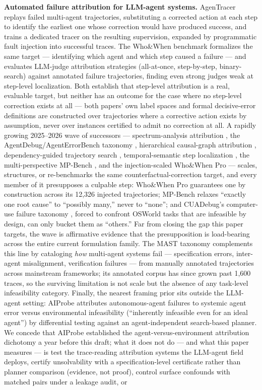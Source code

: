 \documentclass[11pt]{article}
\begin{document}
\textbf{Automated failure attribution for LLM-agent systems.} AgenTracer \citep{AgenTracer05D} replays failed multi-agent trajectories, substituting a corrected action at each step to identify the earliest one whose correction would have produced success, and trains a dedicated tracer on the resulting supervision, expanded by programmatic fault injection into successful traces. The Who\&When benchmark \citep{WhoWhen0212} formalizes the same target --- identifying which agent and which step caused a failure --- and evaluates LLM-judge attribution strategies (all-at-once, step-by-step, binary-search) against annotated failure trajectories, finding even strong judges weak at step-level localization. Both establish that step-level attribution is a real, evaluable target, but neither has an outcome for the case where no step-level correction exists at all --- both papers' own label spaces and formal decisive-error definitions are constructed over trajectories where a corrective action exists by assumption, never over instances certified to admit no correction at all. A rapidly growing 2025--2026 wave of successors --- spectrum-analysis attribution \citep{FAMAS3782}, the AgentDebug/AgentErrorBench taxonomy \citep{AgentDebug5370}, hierarchical causal-graph attribution \citep{CHIEF3701}, dependency-guided trajectory search \citep{FALAT0765}, temporal-semantic step localization \citep{StepFinder3467}, the multi-perspective MP-Bench \citep{MPBench5001}, and the injection-scaled Who\&When Pro \citep{WhoWhenPro9996} --- scales, structures, or re-benchmarks the same counterfactual-correction target, and every member of it presupposes a culpable step: Who\&When Pro guarantees one by construction across its 12{,}326 injected trajectories; MP-Bench relaxes ``exactly one root cause'' to ``possibly many,'' never to ``none''; and CUADebug's computer-use failure taxonomy \citep{CUADebug2643}, forced to confront OSWorld tasks that are infeasible by design, can only bucket them as ``others.'' Far from closing the gap this paper targets, the wave is affirmative evidence that the presupposition is load-bearing across the entire current formulation family. The MAST taxonomy \citep{MAST3657} complements this line by cataloging \emph{how} multi-agent systems fail --- specification errors, inter-agent misalignment, verification failures --- from manually annotated trajectories across mainstream frameworks; its annotated corpus has since grown past 1{,}600 traces, so the surviving limitation is not scale but the absence of any task-level infeasibility category. Finally, the nearest framing prior sits outside the LLM-agent setting: AIProbe \citep{AIProbe3870} attributes autonomous-agent failures to systemic agent error versus environmental infeasibility (``inherently infeasible even for an ideal agent'') by differential testing against an agent-independent search-based planner. We concede that AIProbe established the agent-versus-environment attribution dichotomy a year before this draft; what it does not do --- and what this paper measures --- is test the trace-reading attribution systems the LLM-agent field deploys, certify unsolvability with a specification-level certificate rather than planner comparison (evidence, not proof), control surface confounds with matched pairs under a leakage audit, or 
\end{document}

